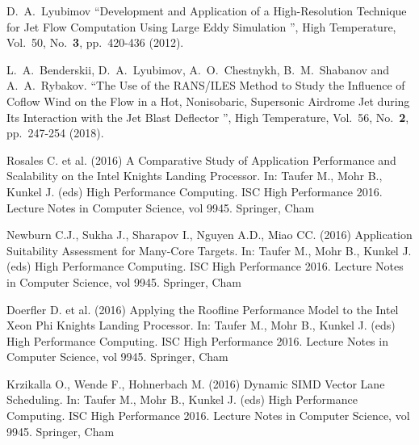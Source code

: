 \documentclass[
11pt,%
tightenlines,%
twoside,%
onecolumn,%
nofloats,%
nobibnotes,%
nofootinbib,%
superscriptaddress,%
noshowpacs,%
centertags]%
{revtex4}
\begin{document}
\begin{thebibliography}{99}




D.~A.~Lyubimov \textquotedblleft Development and Application of a High-Resolution Technique for Jet Flow Computation Using Large Eddy Simulation \textquotedblright, High Temperature, Vol.~50, No.~\textbf{3}, pp.~420-436 (2012).

L.~A.~Benderskii, D.~A.~Lyubimov, A.~O.~Chestnykh, B.~M.~Shabanov and A.~A.~Rybakov. \textquotedblleft The Use of the RANS/ILES Method to Study the Influence of Coflow Wind on the Flow in a Hot, Nonisobaric, Supersonic Airdrome Jet during Its Interaction with the Jet Blast Deflector \textquotedblright, High Temperature, Vol.~56, No.~\textbf{2}, pp.~247-254 (2018).



Rosales C. et al. (2016) A Comparative Study of Application Performance and Scalability on the Intel Knights Landing Processor. In: Taufer M., Mohr B., Kunkel J. (eds) High Performance Computing. ISC High Performance 2016. Lecture Notes in Computer Science, vol 9945. Springer, Cham

Newburn C.J., Sukha J., Sharapov I., Nguyen A.D., Miao CC. (2016) Application Suitability Assessment for Many-Core Targets. In: Taufer M., Mohr B., Kunkel J. (eds) High Performance Computing. ISC High Performance 2016. Lecture Notes in Computer Science, vol 9945. Springer, Cham

Doerfler D. et al. (2016) Applying the Roofline Performance Model to the Intel Xeon Phi Knights Landing Processor. In: Taufer M., Mohr B., Kunkel J. (eds) High Performance Computing. ISC High Performance 2016. Lecture Notes in Computer Science, vol 9945. Springer, Cham

Krzikalla O., Wende F., Hohnerbach M. (2016) Dynamic SIMD Vector Lane Scheduling. In: Taufer M., Mohr B., Kunkel J. (eds) High Performance Computing. ISC High Performance 2016. Lecture Notes in Computer Science, vol 9945. Springer, Cham


\end{thebibliography}
\end{document}
